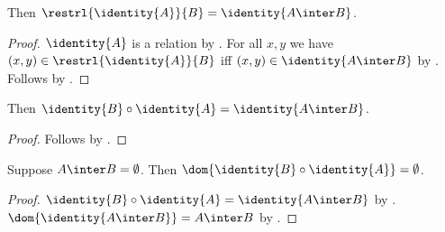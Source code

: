 \begin{theorem}\label{identity_restriction}
    Then $\restrl{\identity{A}}{B}=\identity{A\inter B}$.
\end{theorem}
\begin{proof}
    $\identity{A}$ is a relation by .
    For all $x,y$ we have $(x,y)\in\restrl{\identity{A}}{B}$
        iff $(x,y)\in\identity{A\inter B}$ by .
    Follows by .
\end{proof}

\begin{theorem}\label{identity_partial_composition}
    Then $\identity{B}\circ\identity{A}=\identity{A\inter B}$.
\end{theorem}
\begin{proof}
    Follows by
        .
\end{proof}

\begin{corollary}\label{disjoint_identity_composition_domain}
    Suppose $A\inter B=\emptyset$.
    Then $\dom{\identity{B}\circ\identity{A}}=\emptyset$.
\end{corollary}
\begin{proof}
    $\identity{B}\circ\identity{A}=\identity{A\inter B}$ by
        .
    $\dom{\identity{A\inter B}}=A\inter B$ by .
\end{proof}
